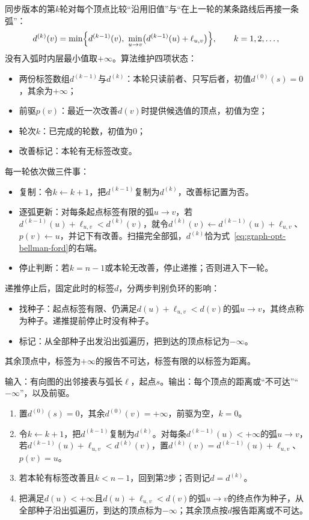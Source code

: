 同步版本的第$k$轮对每个顶点比较“沿用旧值”与“在上一轮的某条路线后再接一条弧”：
\begin{equation}
  d^{(k)}(v)=\min\Bigl\{d^{(k-1)}(v),\ \min_{u\to v}\bigl(d^{(k-1)}(u)+\ell_{u,v}\bigr)\Bigr\},\qquad k=1,2,\ldots,
  \label{eq:graph-opt-bellman-ford}
\end{equation}
没有入弧时内层最小值取$+\infty$。算法维护四项状态：
\begin{itemize}
  \item 两份标签数组$d^{(k-1)}$与$d^{(k)}$：本轮只读前者、只写后者，初值$d^{(0)}(s)=0$，其余为$+\infty$；
  \item 前驱$p(v)$：最近一次改善$d(v)$时提供候选值的顶点，初值为空；
  \item 轮次$k$：已完成的轮数，初值为$0$；
  \item 改善标记：本轮有无标签改变。
\end{itemize}
每一轮依次做三件事：
\begin{itemize}
  \item 复制：令$k\gets k+1$，把$d^{(k-1)}$复制为$d^{(k)}$，改善标记置为否。
  \item 逐弧更新：对每条起点标签有限的弧$u\to v$，若$d^{(k-1)}(u)+\ell_{u,v}<d^{(k)}(v)$，就令$d^{(k)}(v)\gets d^{(k-1)}(u)+\ell_{u,v}$、$p(v)\gets u$，并记下有改善。扫描完全部弧，$d^{(k)}$恰为式~\eqref{eq:graph-opt-bellman-ford}的右端。
  \item 停止判断：若$k=n-1$或本轮无改善，停止递推；否则进入下一轮。
\end{itemize}
递推停止后，固定此时的标签$d$，分两步判别负环的影响：
\begin{itemize}
  \item 找种子：起点标签有限、仍满足$d(u)+\ell_{u,v}<d(v)$的弧$u\to v$，其终点称为种子。递推提前停止时没有种子。
  \item 标记：从全部种子出发沿出弧遍历，把到达的顶点标记为$-\infty$。
\end{itemize}
其余顶点中，标签为$+\infty$的报告不可达，标签有限的以标签为距离。

\begin{algorithm}
\label{alg:graph-opt-bellman-ford}
输入：有向图的出邻接表与弧长$\ell$，起点$s$。输出：每个顶点的距离或“不可达”“$-\infty$”，以及前驱。
\begin{enumerate}
  \item 置$d^{(0)}(s)=0$，其余$d^{(0)}(v)=+\infty$，前驱为空，$k=0$。
  \item 令$k\gets k+1$，把$d^{(k-1)}$复制为$d^{(k)}$。对每条$d^{(k-1)}(u)<+\infty$的弧$u\to v$，若$d^{(k-1)}(u)+\ell_{u,v}<d^{(k)}(v)$，置$d^{(k)}(v)=d^{(k-1)}(u)+\ell_{u,v}$、$p(v)=u$。
  \item 若本轮有标签改善且$k<n-1$，回到第2步；否则记$d=d^{(k)}$。
  \item 把满足$d(u)<+\infty$且$d(u)+\ell_{u,v}<d(v)$的弧$u\to v$的终点作为种子，从全部种子沿出弧遍历，到达的顶点标为$-\infty$；其余顶点按$d$报告距离或不可达。
\end{enumerate}
\end{algorithm}

